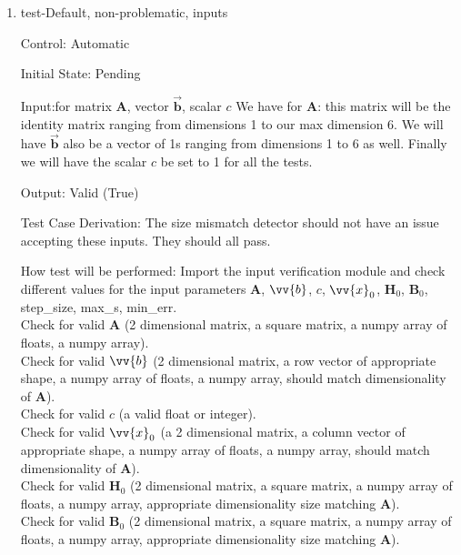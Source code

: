 \documentclass[12pt, titlepage]{article}
\begin{document}
\begin{enumerate}

\item{test-Default, non-problematic, inputs\\}

Control: Automatic
					
Initial State: Pending  
					
Input:for matrix $\mathbf{A}$, vector $\mathbf{\vec{b}}$, scalar $c$
We have for $\mathbf{A}$: this matrix will be the identity matrix ranging 
from dimensions 1 to our max dimension 6. We will have $\mathbf{\vec{b}}$
also be a vector of 1s ranging from dimensions 1 to 6 as well. Finally we 
will have the scalar $c$ be set to 1 for all the tests. 
					
Output: Valid (True)  

Test Case Derivation: The size mismatch detector should not have an issue accepting these
inputs. They should all pass. 
					
How test will be performed: Import the input verification module and check different values for the input parameters $\mathbf{A}$, $\vv{b}$, $c$, $\vv{x}_0$, $\mathbf{H}_0$, $\mathbf{B}_0$, step\_size, max\_s, min\_err.
\\

\noindent Check for valid $\mathbf{A}$ (2 dimensional matrix, a square matrix, a numpy array of floats, a numpy array).  
\\

\noindent Check for valid $\vv{b}$ (2 dimensional matrix, a row vector of appropriate shape, a numpy array of floats, a numpy array, should match dimensionality of $\mathbf{A}$).
\\

\noindent Check for valid $c$ (a valid float or integer).
\\

\noindent Check for valid $\vv{x}_0$ (a 2 dimensional matrix, a column vector of appropriate shape, a numpy array of floats, a numpy array, should match dimensionality of $\mathbf{A}$).
\\

\noindent Check for valid $\mathbf{H}_0$ (2 dimensional matrix, a square matrix, a numpy array of floats, a numpy array, appropriate dimensionality size matching $\mathbf{A}$).  
\\

\noindent Check for valid $\mathbf{B}_0$ (2 dimensional matrix, a square matrix, a numpy array of floats, a numpy array, appropriate dimensionality size matching $\mathbf{A}$).  
\\


\end{enumerate}
\end{document}
